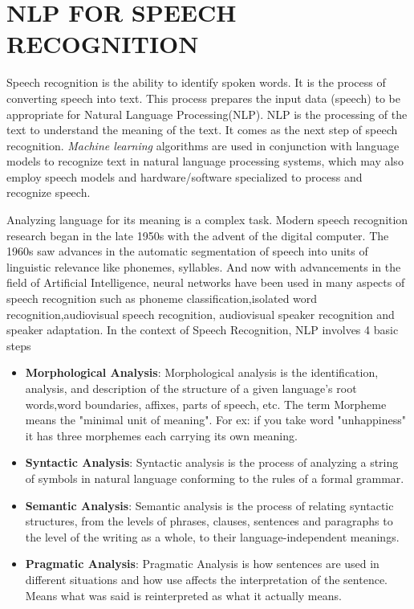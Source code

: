 \documentclass[sigconf]{acmart}
\begin{document}
\section{NLP FOR SPEECH RECOGNITION}
Speech recognition is the ability to identify spoken words. It is the process of converting speech into text. This process prepares the input data (speech) to be appropriate for Natural Language Processing(NLP). NLP is the processing of the text to understand the meaning of the text. It comes as the next step of speech recognition. \textit{Machine learning} algorithms are used in conjunction with  language models to recognize text in natural language processing systems, which may also employ  speech models and hardware/software specialized to process and recognize speech. 

Analyzing language for its meaning is a complex task. Modern speech recognition research began in the late 1950s with the advent of the digital computer. The 1960s saw advances in the automatic segmentation of speech into units of linguistic relevance like phonemes, syllables. And now with advancements in the field of Artificial Intelligence, neural networks have been used in many aspects of speech recognition such as phoneme classification,isolated word recognition,audiovisual speech recognition, audiovisual speaker recognition and speaker adaptation. In the context of Speech Recognition, NLP involves 4 basic steps
  \begin{itemize}
     \item \textbf{Morphological Analysis}:
     Morphological analysis is the identification, analysis, and description of the structure of a given language’s root words,word boundaries, affixes, parts of speech, etc. The term Morpheme means the "minimal unit of meaning". For ex: if you take word "unhappiness" it has three morphemes each carrying its own meaning.
     \item \textbf{Syntactic Analysis}:
     Syntactic analysis is the process of analyzing a string of symbols in natural language conforming to the rules of a formal grammar.
     \item \textbf{Semantic Analysis}:
     Semantic analysis is the process of relating syntactic structures, from the levels of phrases, clauses, sentences and paragraphs to the level of the writing as a whole, to their language-independent meanings.
     \item \textbf{Pragmatic Analysis}:
     Pragmatic Analysis is how sentences are used in different situations and how use affects the interpretation of the sentence. Means what was said is reinterpreted as what it actually means.
  \end{itemize}
\end{document}
